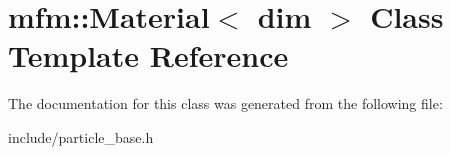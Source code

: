 \hypertarget{classmfm_1_1_material}{}\section{mfm\+:\+:Material$<$ dim $>$ Class Template Reference}
\label{classmfm_1_1_material}


The documentation for this class was generated from the following file\+:\begin{DoxyCompactItemize}
\item 
include/particle\+\_\+base.\+h\end{DoxyCompactItemize}
